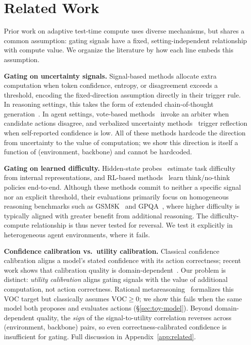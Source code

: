 \section{Related Work}
\vspace{-0.1in}
\label{sec:related}
Prior work on adaptive test-time compute uses diverse mechanisms, but shares a common assumption: gating signals have a fixed, setting-independent relationship with compute value. We organize the literature by how each line embeds this assumption.

\textbf{Gating on uncertainty signals.}
Signal-based methods allocate extra computation when token confidence, entropy, or disagreement exceeds a threshold, encoding the fixed-direction assumption directly in their trigger rule. In reasoning settings, this takes the form of extended chain-of-thought generation~\cite{seag2025, cats2025, corefine2026, thinkjustenough2025, s1_2025, han2025tokenbudget}. In agent settings, vote-based methods~\cite{catts2026} invoke an arbiter when candidate actions disagree, and verbalized uncertainty methods~\cite{auq2026} trigger reflection when self-reported confidence is low. All of these methods hardcode the direction from uncertainty to the value of computation; we show this direction is itself a function of (environment, backbone) and cannot be hardcoded.

\textbf{Gating on learned difficulty.}
Hidden-state probes~\cite{diffadapt2025, zhu2025llmalreadyknows} estimate task difficulty from internal representations, and RL-based methods~\cite{adaptthink2025, thinkless2025, aggarwal2025l1, paglieri2025learning} learn think/no-think policies end-to-end. Although these methods commit to neither a specific signal nor an explicit threshold, their evaluations primarily focus on homogeneous reasoning benchmarks such as GSM8K~\cite{DBLP:journals/corr/abs-2110-14168} and GPQA~\cite{DBLP:journals/corr/abs-2311-12022}, where higher difficulty is typically aligned with greater benefit from additional reasoning. The difficulty-compute relationship is thus never tested for reversal. We test it explicitly in heterogeneous agent environments, where it fails.

\textbf{Confidence calibration vs.\ utility calibration.}
Classical confidence calibration aligns a model's stated confidence with its action correctness; recent work shows that calibration quality is domain-dependent~\cite{tao2025revisiting, heo2025llmuncertainty, yadkori2024believe}. Our problem is distinct: \emph{utility calibration} aligns gating signals with the value of additional computation, not action correctness. Rational metareasoning~\cite{russell1991right, desabbata2024metareasoning} formalizes this VOC target but classically assumes $\text{VOC} \geq 0$; we show this fails when the same model both proposes and evaluates actions (\S\ref{sec:toy-model}). Beyond domain-dependent quality, the \emph{sign} of the signal-to-utility correlation reverses across (environment, backbone) pairs, so even correctness-calibrated confidence is insufficient for gating. Full discussion in Appendix~\ref{app:related}.